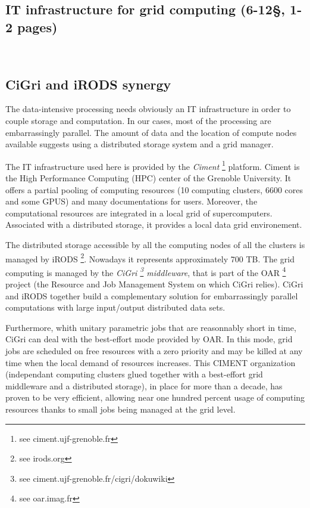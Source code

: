 \documentclass[a4paper, 10pt]{article}
\begin{document}
\newpage
\begin{multicols}{2}



\section{IT infrastructure for grid computing (6-12\S , 1-2 pages) }
~\\


\subsection{CiGri and iRODS synergy}

The data-intensive processing
needs obviously an IT infrastructure in order to couple storage and computation.
In our cases, most of the processing are embarrassingly parallel.
The amount of data and the location of compute nodes available suggests using a 
distributed storage system and a grid manager.


The IT infrastructure used here is provided by the \emph{Ciment} \footnote{see ciment.ujf-grenoble.fr} 
platform. Ciment is the High Performance Computing (HPC) center of the Grenoble University. It offers a partial pooling of computing 
resources (10 computing clusters, 6600 cores and some GPUS) and many documentations for users. 
Moreover, the computational resources are integrated in a local grid of supercomputers. Associated with a distributed storage,
it provides a local data grid environement.

The distributed storage accessible by all the computing nodes of all the clusters is managed by iRODS \footnote{see irods.org}.
Nowadays it represents approximately 700 TB. The grid computing is managed by the \emph{CiGri 
\footnote{see ciment.ujf-grenoble.fr/cigri/dokuwiki} middleware}, that is part of the OAR \footnote{see oar.imag.fr} project (the Resource and Job Management System on which CiGri relies). CiGri and iRODS together build a complementary solution for embarrassingly parallel computations with large input/output distributed data sets.

Furthermore, whith unitary parametric jobs that are reasonnably short in time, CiGri can deal with the best-effort mode provided by OAR. In this mode, grid jobs are scheduled on free resources with a zero priority and may be killed at any time when the local demand of resources increases. This CIMENT organization (independant computing clusters glued together with a best-effort grid middleware and a distributed storage), in place for more than a decade, has proven to be very efficient, allowing near one hundred percent usage of computing resources thanks to small jobs being managed at the grid level.


\end{multicols}
\end{document}
